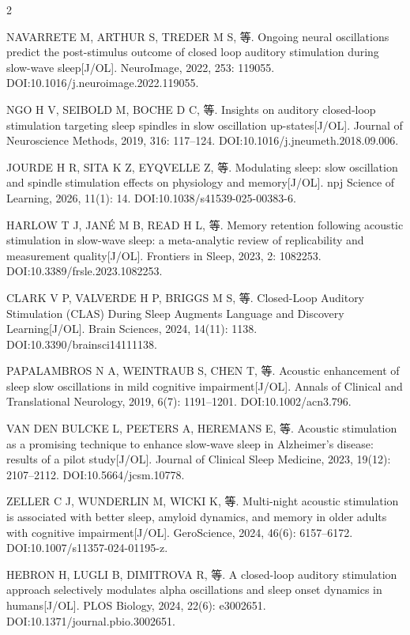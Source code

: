 \documentclass[UTF8,zihao=5,fontset=none]{ctexart}
\begin{document}
\begin{multicols}{2}
{\makebox[25.2pt][l]{[48]}NAVARRETE M, ARTHUR S, TREDER M S, 等. Ongoing neural oscillations predict the post-stimulus outcome of closed loop auditory stimulation during slow-wave sleep[J/OL]. NeuroImage, 2022, 253: 119055. DOI:10.1016/j.neuroimage.2022.119055.\par
\makebox[25.2pt][l]{[49]}NGO H V, SEIBOLD M, BOCHE D C, 等. Insights on auditory closed-loop stimulation targeting sleep spindles in slow oscillation up-states[J/OL]. Journal of Neuroscience Methods, 2019, 316: 117--124. DOI:10.1016/j.jneumeth.2018.09.006.\par
\makebox[25.2pt][l]{[50]}JOURDE H R, SITA K Z, EYQVELLE Z, 等. Modulating sleep: slow oscillation and spindle stimulation effects on physiology and memory[J/OL]. npj Science of Learning, 2026, 11(1): 14. DOI:10.1038/s41539-025-00383-6.\par
\makebox[25.2pt][l]{[51]}HARLOW T J, JANÉ M B, READ H L, 等. Memory retention following acoustic stimulation in slow-wave sleep: a meta-analytic review of replicability and measurement quality[J/OL]. Frontiers in Sleep, 2023, 2: 1082253. DOI:10.3389/frsle.2023.1082253.\par
\makebox[25.2pt][l]{[52]}CLARK V P, VALVERDE H P, BRIGGS M S, 等. Closed-Loop Auditory Stimulation (CLAS) During Sleep Augments Language and Discovery Learning[J/OL]. Brain Sciences, 2024, 14(11): 1138. DOI:10.3390/brainsci14111138.\par
\makebox[25.2pt][l]{[53]}PAPALAMBROS N A, WEINTRAUB S, CHEN T, 等. Acoustic enhancement of sleep slow oscillations in mild cognitive impairment[J/OL]. Annals of Clinical and Translational Neurology, 2019, 6(7): 1191--1201. DOI:10.1002/acn3.796.\par
\makebox[25.2pt][l]{[54]}VAN DEN BULCKE L, PEETERS A, HEREMANS E, 等. Acoustic stimulation as a promising technique to enhance slow-wave sleep in Alzheimer’s disease: results of a pilot study[J/OL]. Journal of Clinical Sleep Medicine, 2023, 19(12): 2107--2112. DOI:10.5664/jcsm.10778.\par
\makebox[25.2pt][l]{[55]}ZELLER C J, WUNDERLIN M, WICKI K, 等. Multi-night acoustic stimulation is associated with better sleep, amyloid dynamics, and memory in older adults with cognitive impairment[J/OL]. GeroScience, 2024, 46(6): 6157--6172. DOI:10.1007/s11357-024-01195-z.\par
\makebox[25.2pt][l]{[56]}HEBRON H, LUGLI B, DIMITROVA R, 等. A closed-loop auditory stimulation approach selectively modulates alpha oscillations and sleep onset dynamics in humans[J/OL]. PLOS Biology, 2024, 22(6): e3002651. DOI:10.1371/journal.pbio.3002651.\par
}
\end{multicols}
\end{document}
